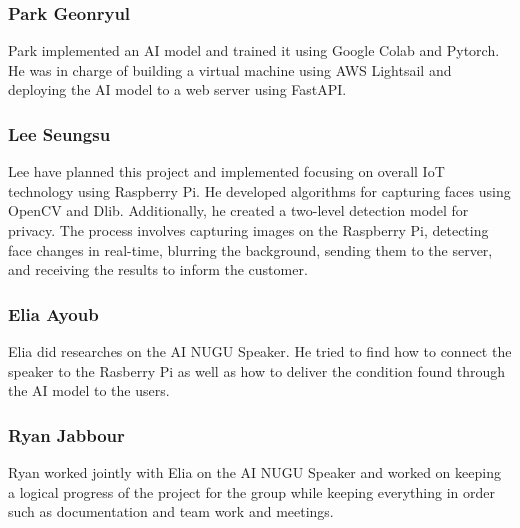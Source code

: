 \subsubsection{\textbf{Park Geonryul}}
Park implemented an AI model and trained it using Google Colab and Pytorch. He was in charge of building a virtual machine using AWS Lightsail and deploying the AI model to a web server using FastAPI.\\

\subsubsection{\textbf{Lee Seungsu}}
Lee have planned this project and implemented focusing on overall IoT technology using Raspberry Pi. He developed algorithms for capturing faces using OpenCV and Dlib. Additionally, he created a two-level detection model for privacy. The process involves capturing images on the Raspberry Pi, detecting face changes in real-time, blurring the background, sending them to the server, and receiving the results to inform the customer.\\
\subsubsection{\textbf{Elia Ayoub}}
Elia did researches on the AI NUGU Speaker. He tried to find how to connect the speaker to the Rasberry Pi as well as how to deliver the condition found through the AI model to the users.\\
\subsubsection{\textbf{Ryan Jabbour}}
Ryan worked jointly with Elia on the AI NUGU Speaker and worked on keeping a logical progress of the project for the group while keeping everything in order such as documentation and team work and meetings.\\